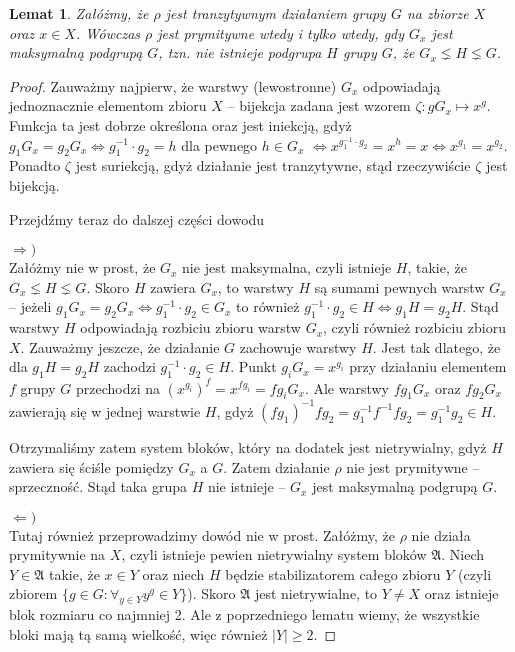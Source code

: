\documentclass[licencjacka]{pracamgr}
\newtheorem{lemma}{Lemat}[section]
\begin{document}
\begin{lemma}
	Załóżmy, że $\rho$ jest tranzytywnym działaniem grupy $G$ na zbiorze $X$ oraz $x \in X$.
	Wówczas $\rho$ jest prymitywne wtedy i tylko wtedy, gdy $G_x$ jest maksymalną podgrupą $G$, tzn.
	nie istnieje podgrupa $H$ grupy $G$, że $G_x \lneq H \lneq G$.
\end{lemma}
\begin{proof}
Zauważmy najpierw, że warstwy (lewostronne) $G_x$ odpowiadają jednoznacznie elementom zbioru $X$ --
bijekcja zadana jest wzorem $\zeta \colon g G_x \mapsto x^g$.
Funkcja ta jest dobrze określona oraz jest iniekcją, gdyż $g_1 G_x = g_2 G_x \iff g_1^{-1} \cdot g_2 = h$ dla pewnego $h \in G_x$
$\iff x^{g_1^{-1} \cdot g_2} = x^h = x \iff x^{g_1} = x^{g_2}$.
Ponadto $\zeta$ jest suriekcją, gdyż działanie jest tranzytywne, stąd rzeczywiście $\zeta$ jest bijekcją.

Przejdźmy teraz do dalszej części dowodu

$\Rightarrow)$ \\
Załóżmy nie w prost, że $G_x$ nie jest maksymalna, czyli istnieje $H$, takie, że $G_x \lneq H \lneq G$.
Skoro $H$ zawiera $G_x$, to warstwy $H$ są sumami pewnych warstw $G_x$ -- 
jeżeli $g_1 G_x = g_2 G_x \iff g_1^{-1} \cdot g_2 \in G_x$ to również $g_1^{-1} \cdot g_2 \in H \iff g_1 H = g_2 H$.
Stąd warstwy $H$ odpowiadają rozbiciu zbioru warstw $G_x$, czyli również rozbiciu zbioru $X$.
Zauważmy jeszcze, że działanie $G$ zachowuje warstwy $H$.
Jest tak dlatego, że dla $g_1 H = g_2 H$ zachodzi $g_1^{-1} \cdot g_2 \in H$.
Punkt $g_i G_x = x^{g_i}$ przy działaniu elementem $f$ grupy $G$ przechodzi na $(x^{g_i})^f = x^{f g_i} = f g_i G_x$.
Ale warstwy $f g_1 G_x$ oraz $f g_2 G_x$ zawierają się w jednej warstwie $H$, gdyż $(f g_1)^{-1} f g_2 = g_1^{-1} f^{-1} f g_2 = g_1^{-1} g_2 \in H$.

Otrzymaliśmy zatem system bloków, który na dodatek jest nietrywialny, gdyż $H$ zawiera się ściśle pomiędzy $G_x$ a $G$.
Zatem działanie $\rho$ nie jest prymitywne -- sprzeczność.
Stąd taka grupa $H$ nie istnieje -- $G_x$ jest maksymalną podgrupą $G$.

$\Leftarrow)$ \\
Tutaj również przeprowadzimy dowód nie w prost.
Załóżmy, że $\rho$ nie działa prymitywnie na $X$, czyli istnieje pewien nietrywialny system bloków $\mathfrak{A}$.
Niech $Y \in \mathfrak{A}$ takie, że $x \in Y$ oraz niech $H$ będzie stabilizatorem całego zbioru $Y$
(czyli zbiorem $\{g \in G \colon \forall_{y \in Y} y^g \in Y \}$).
Skoro $\mathfrak{A}$ jest nietrywialne, to $Y \ne X$ oraz istnieje blok rozmiaru co najmniej 2.
Ale z poprzedniego lematu wiemy, że wszystkie bloki mają tą samą wielkość, więc również $|Y| \ge 2$.


\end{proof}
\end{document}
